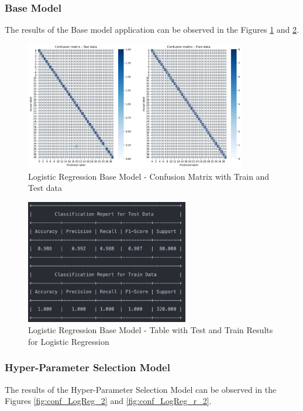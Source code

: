 \documentclass[conference]{IEEEtran}
\begin{document}
\subsubsection{Base Model}
The results of the Base model application can be observed in the Figures \ref{fig:conf_LogReg_1} and \ref{fig:conf_LogReg_r_1}. 

\begin{figure}[H]
    \centering
    \includegraphics[width=3.8in]{LogReg/logreg_1.png}%
    \caption{Logistic Regression Base Model - Confusion Matrix with Train and Test data}%
    \label{fig:conf_LogReg_1}%
\end{figure}

\begin{figure}[H]
    \centering
    \includegraphics[width=2.8in]{LogReg/logreg_r_1.png}%
    \caption{Logistic Regression Base Model - Table with Test and Train Results for Logistic Regression}%
    \label{fig:conf_LogReg_r_1}%
\end{figure}

\subsubsection{Hyper-Parameter Selection Model}
The results of the Hyper-Parameter Selection Model can be observed in the Figures \ref{fig:conf_LogReg_2} and \ref{fig:conf_LogReg_r_2}. 
\end{document}
